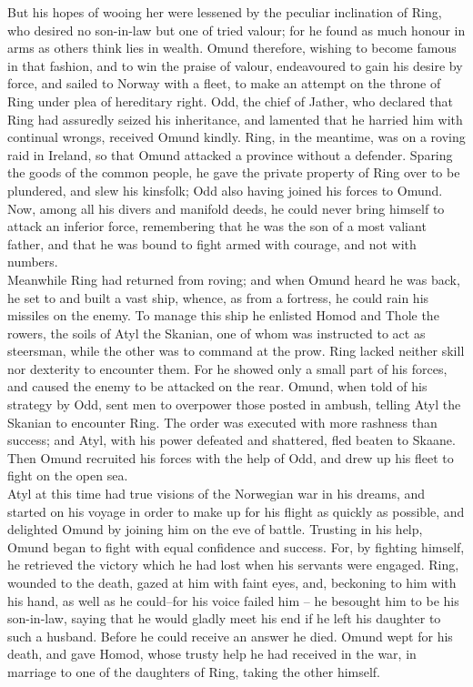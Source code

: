 \documentclass[10pt,a4paper]{report}
\begin{document}
But his hopes of wooing her were lessened by the peculiar inclination of Ring, who desired no son-in-law but one of tried valour; for he found as much honour in arms as others think lies in wealth. Omund therefore, wishing to become famous in that fashion, and to win the praise of valour, endeavoured to gain his desire by force, and sailed to Norway with a fleet, to make an attempt on the throne of Ring under plea of hereditary right. Odd, the chief of Jather, who declared that Ring had assuredly seized his inheritance, and lamented that he harried him with continual wrongs, received Omund kindly. Ring, in the meantime, was on a roving raid in Ireland, so that Omund attacked a province without a defender. Sparing the goods of the common people, he gave the private property of Ring over to be plundered, and slew his kinsfolk; Odd also having joined his forces to Omund. Now, among all his divers and manifold deeds, he could never bring himself to attack an inferior force, remembering that he was the son of a most valiant father, and that he was bound to fight armed with courage, and not with numbers.\\

Meanwhile Ring had returned from roving; and when Omund heard he was back, he set to and built a vast ship, whence, as from a fortress, he could rain his missiles on the enemy. To manage this ship he enlisted Homod and Thole the rowers, the soils of Atyl the Skanian, one of whom was instructed to act as steersman, while the other was to command at the prow. Ring lacked neither skill nor dexterity to encounter them. For he showed only a small part of his forces, and caused the enemy to be attacked on the rear. Omund, when told of his strategy by Odd, sent men to overpower those posted in ambush, telling Atyl the Skanian to encounter Ring. The order was executed with more rashness than success; and Atyl, with his power defeated and shattered, fled beaten to Skaane. Then Omund recruited his forces with the help of Odd, and drew up his fleet to fight on the open sea.\\

Atyl at this time had true visions of the Norwegian war in his dreams, and started on his voyage in order to make up for his flight as quickly as possible, and delighted Omund by joining him on the eve of battle. Trusting in his help, Omund began to fight with equal confidence and success. For, by fighting himself, he retrieved the victory which he had lost when his servants were engaged. Ring, wounded to the death, gazed at him with faint eyes, and, beckoning to him with his hand, as well as he could--for his voice failed him -- he besought him to be his son-in-law, saying that he would gladly meet his end if he left his daughter to such a husband. Before he could receive an answer he died. Omund wept for his death, and gave Homod, whose trusty help he had received in the war, in marriage to one of the daughters of Ring, taking the other himself.\\
\end{document}
